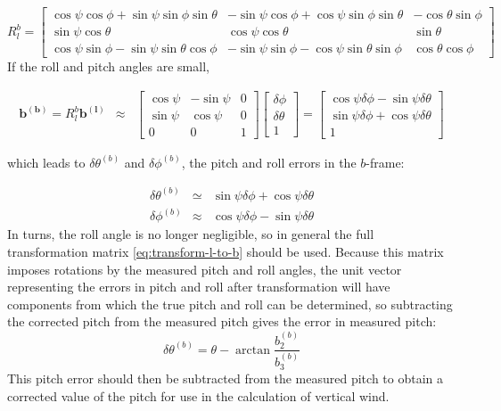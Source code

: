 \documentclass[12pt,twoside,english]{article}\usepackage[]{graphicx}\usepackage[]{color}
\let\OrgIndex\index
\renewcommand*{\index}[1]{\OrgIndex{#1}}
\begin{document}
\begin{equation}
R_{l}^{b}=\begin{bmatrix}\cos\psi\cos\phi+\sin\psi\sin\phi\sin\theta & -\sin\psi\cos\phi+\cos\psi\sin\phi\sin\theta & -\cos\theta\sin\phi\\ 
\sin\psi\cos\theta & \cos\psi\cos\theta & \sin\theta\\ 
\cos\psi\sin\phi-\sin\psi\sin\theta\cos\phi & -\sin\psi\sin\phi-\cos\psi\sin\theta\sin\phi & \cos\theta\cos\phi 
\end{bmatrix}\label{eq:transform-l-to-b}
\end{equation}
If the roll and pitch angles are small, 

\begin{eqnarray}
\mathbf{b^{(b)}=}R_{l}^{b}\mathbf{b^{(l)}} & \approx & \left[\begin{array}{ccc}
\cos\psi & -\sin\psi & 0\\ 
\sin\psi & \cos\psi & 0\\ 0 & 0 & 1 
\end{array}\right]\begin{bmatrix}\delta\phi\\ 
\delta\theta\\ 1 
\end{bmatrix}=\begin{bmatrix}\cos\psi\delta\phi-\sin\psi\delta\theta\\ 
\sin\psi\delta\phi+\cos\psi\delta\theta\\ 1 
\end{bmatrix}\label{eq:b-vector-in-b-frame}
\end{eqnarray}


which leads to $\delta\theta^{(b)}$ and $\delta\phi^{(b)}$, the pitch and roll errors in the $b$-frame: 

\begin{eqnarray}
\delta\theta^{(b)} & \simeq & \sin\psi\delta\phi+\cos\psi\delta\theta\label{eq:final-answer}\\ 
\delta\phi^{(b)} & \approx & \cos\psi\delta\phi-\sin\psi\delta\theta\nonumber  
\end{eqnarray}
In turns, the roll angle is no longer negligible, so in general the full transformation matrix \eqref{eq:transform-l-to-b} should be used. Because this matrix imposes rotations by the measured pitch and roll angles, the unit vector representing the errors in pitch and roll after transformation will have components from which the true pitch and roll can be determined, so subtracting the corrected pitch from the measured pitch gives the error in measured pitch: \\ 
\begin{equation}
\delta\theta^{(b)}=\theta-\arctan\frac{b_{2}^{(b)}}{b_{3}^{(b)}}\label{eq:pitch-error-wo-approx} 
\end{equation}
This pitch error should then be subtracted from the measured pitch to obtain a corrected value of the pitch for use in the calculation of vertical wind. 
\end{document}

